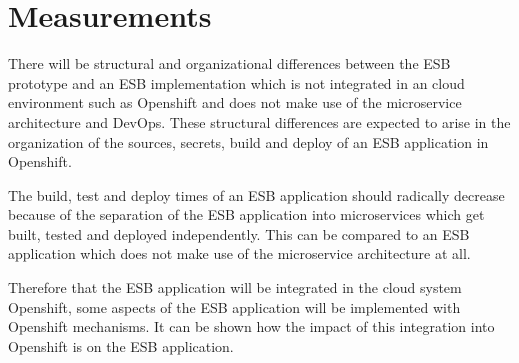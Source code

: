 \section{Measurements}
\label{sec:empiric}
There will be structural and organizational differences between the ESB prototype and an ESB implementation which is not integrated in an cloud environment such as Openshift and does not make use of the microservice architecture and DevOps. These structural differences are expected to arise in the organization of the sources, secrets, build and deploy of an ESB application in Openshift. 

The build, test and deploy times of an ESB application should radically decrease because of the separation of the ESB application into microservices which get built, tested and deployed independently. This can be compared to an ESB application which does not make use of the microservice architecture at all.

Therefore that the ESB application will be integrated in the cloud system Openshift, some aspects of the ESB application will be implemented with Openshift mechanisms. It can be shown how the impact of this integration into Openshift is on the ESB application. 